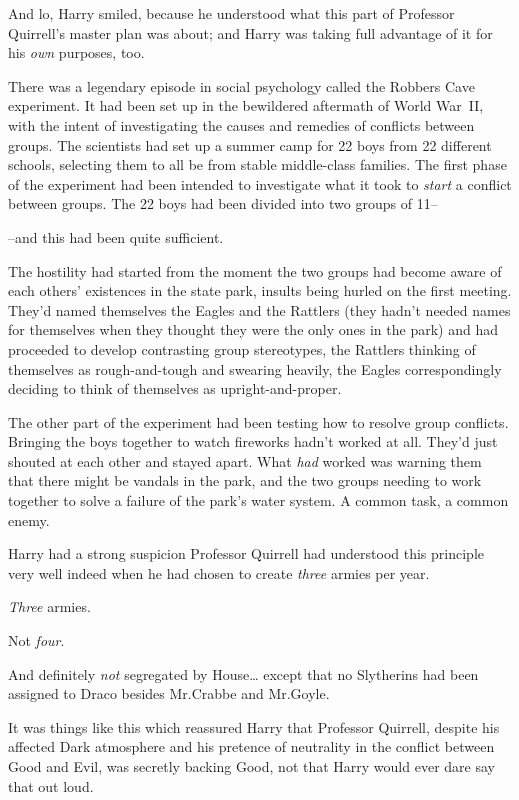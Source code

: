 And lo, Harry smiled, because he understood what this part of Professor Quirrell's master plan was about; and Harry was taking full advantage of it for his \emph{own} purposes, too.

There was a legendary episode in social psychology called the Robbers Cave experiment. It had been set up in the bewildered aftermath of World War~II, with the intent of investigating the causes and remedies of conflicts between groups. The scientists had set up a summer camp for 22 boys from 22 different schools, selecting them to all be from stable middle-class families. The first phase of the experiment had been intended to investigate what it took to \emph{start} a conflict between groups. The 22 boys had been divided into two groups of 11\---

\---and this had been quite sufficient.

The hostility had started from the moment the two groups had become aware of each others' existences in the state park, insults being hurled on the first meeting. They'd named themselves the Eagles and the Rattlers (they hadn't needed names for themselves when they thought they were the only ones in the park) and had proceeded to develop contrasting group stereotypes, the Rattlers thinking of themselves as rough-and-tough and swearing heavily, the Eagles correspondingly deciding to think of themselves as upright-and-proper.

The other part of the experiment had been testing how to resolve group conflicts. Bringing the boys together to watch fireworks hadn't worked at all. They'd just shouted at each other and stayed apart. What \emph{had} worked was warning them that there might be vandals in the park, and the two groups needing to work together to solve a failure of the park's water system. A common task, a common enemy.

Harry had a strong suspicion Professor Quirrell had understood this principle very well indeed when he had chosen to create \emph{three} armies per year.

\emph{Three} armies.

Not \emph{four}.

And definitely \emph{not} segregated by House{\ldots} except that no Slytherins had been assigned to Draco besides Mr.\?Crabbe and Mr.\?Goyle.

It was things like this which reassured Harry that Professor Quirrell, despite his affected Dark atmosphere and his pretence of neutrality in the conflict between Good and Evil, was secretly backing Good, not that Harry would ever dare say that out loud.

